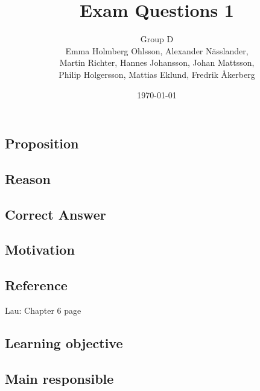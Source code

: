 \documentclass[a4paper]{article}
\title{Exam Questions 1}
\author{Group D\\ Emma Holmberg Ohlsson, Alexander Nässlander,\\Martin Richter, Hannes Johansson, Johan Mattsson,\\Philip Holgersson, Mattias Eklund, Fredrik Åkerberg}
\date{\today}
\begin{document}
	\maketitle
	\thispagestyle{empty}
	\setcounter{page}{0}
	\pagebreak



\section{}
\subsection*{Proposition}
\subsection*{Reason}
\subsection*{Correct Answer}
\subsection*{Motivation}
\subsection*{Reference}
Lau: Chapter 6 page
\subsection*{Learning objective}
\subsection*{Main responsible}
\end{document}

